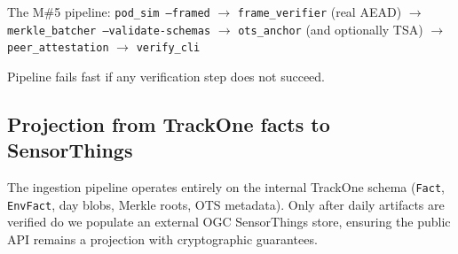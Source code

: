 The M\#5 pipeline: \texttt{pod\_sim --framed} $\rightarrow$ \texttt{frame\_verifier} (real AEAD) $\rightarrow$ \texttt{merkle\_batcher --validate-schemas} $\rightarrow$ \texttt{ots\_anchor} (and optionally TSA) $\rightarrow$ \texttt{peer\_attestation} $\rightarrow$ \texttt{verify\_cli}

Pipeline fails fast if any verification step does not succeed.

%


\subsection{Projection from TrackOne facts to SensorThings}
The ingestion pipeline operates entirely on the internal TrackOne schema (\texttt{Fact}, \texttt{EnvFact}, day blobs, Merkle roots, OTS metadata). Only after daily artifacts are verified do we populate an external OGC SensorThings store, ensuring the public API remains a projection with cryptographic guarantees.

